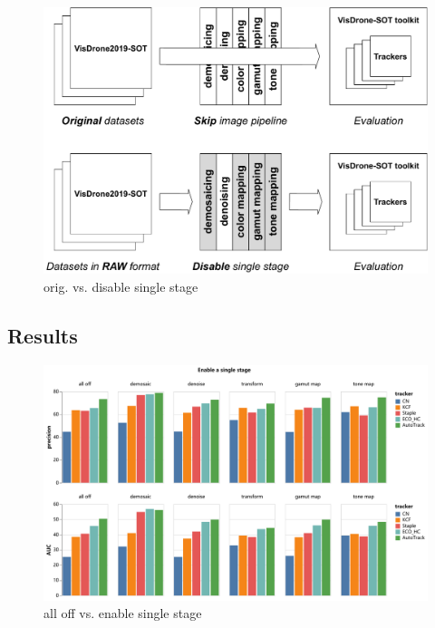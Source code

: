 \documentclass{beamer}
\begin{document}
\begin{frame}
    \begin{figure}[htpb]
        \begin{center}
            \includegraphics[width=0.8\linewidth]{fig/eva2.pdf}
            \caption{orig. vs. disable single stage}
        \end{center}
    \end{figure}
\end{frame}

\subsection{Results}

\begin{frame}
    \begin{figure}[htpb]
        \begin{center}
            \includegraphics[width=0.8\linewidth]{fig/en.pdf}
            \caption{all off vs. enable single stage}
        \end{center}
    \end{figure}
\end{frame}
\end{document}
